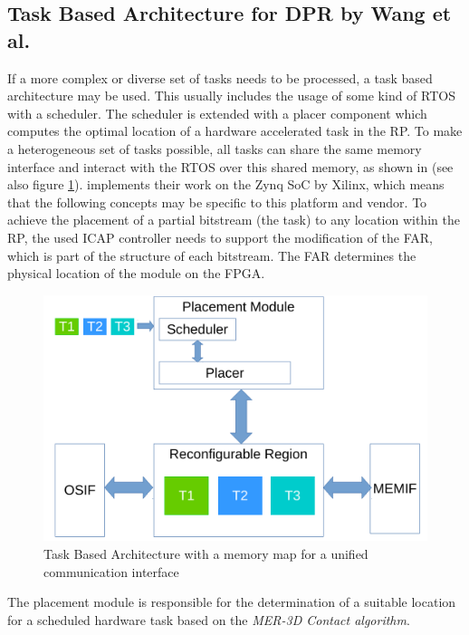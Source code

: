\subsection{Task Based Architecture for \gls{DPR} by Wang et al.}\label{TaskBasedArchitectureWang}
If a more complex or diverse set of tasks needs to be processed, a task based architecture may be used. 
This usually includes the usage of some kind of \gls{RTOS} with a scheduler.
The scheduler is extended with a placer component which computes the optimal location of a hardware accelerated task in the \gls{RP}.
To make a heterogeneous set of tasks possible, all tasks can share the same memory interface and interact with the \gls{RTOS} over this shared memory, as shown in \cite{wang_dynamic_2018} (see also figure \ref{fig:TaskBased}).
\cite{wang_dynamic_2018} implements their work on the Zynq \gls{SoC} by Xilinx, which means that the following concepts may be specific to this platform and vendor. 
To achieve the placement of a partial bitstream (the task) to any location within the \gls{RP}, the used \gls{ICAP} controller needs to support the modification of the \gls{FAR}, which is part of the structure of each bitstream.
The \gls{FAR} determines the physical location of the module on the \gls{FPGA}.
\begin{figure}
    \centering
    \includegraphics[width=\columnwidth]{graphics/TaskBased.pdf}
    \caption{Task Based Architecture with a memory map for a unified communication interface}\label{fig:TaskBased}
\end{figure}
The placement module is responsible for the determination of a suitable location for a scheduled hardware task based on the \textit{MER-3D Contact algorithm}. 
